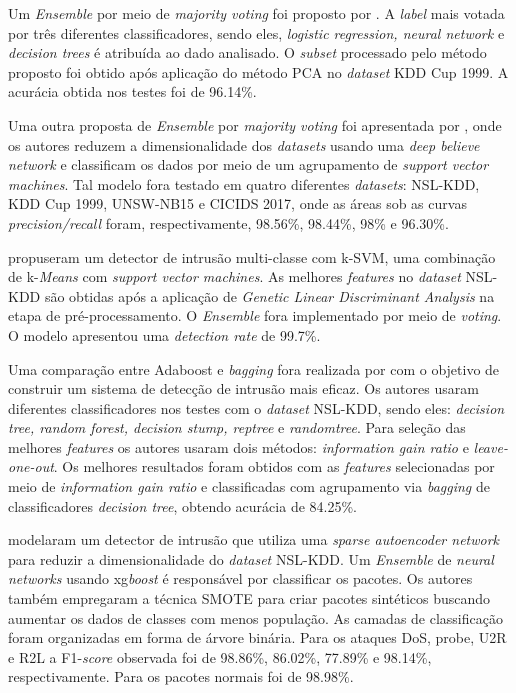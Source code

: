 Um \textit{Ensemble} por meio de \textit{majority voting} foi proposto por . A \textit{label} mais votada por três diferentes classificadores, sendo eles, \textit{logistic regression, neural network} e \textit{decision trees} é atribuída ao dado analisado. O \textit{subset} processado pelo método proposto foi obtido após aplicação do método PCA no \textit{dataset} KDD Cup 1999. A acurácia obtida nos testes foi de 96.14\%.

Uma outra proposta de \textit{Ensemble} por \textit{majority voting} foi apresentada por , onde os autores reduzem a dimensionalidade dos \textit{datasets} usando uma \textit{deep believe network} e classificam os dados por meio de um agrupamento de \textit{support vector machines}. Tal modelo fora testado em quatro diferentes \textit{datasets}: NSL-KDD, KDD Cup 1999, UNSW-NB15 e CICIDS 2017, onde as áreas sob as curvas \textit{precision/recall} foram, respectivamente, 98.56\%, 98.44\%, 98\% e 96.30\%.

 propuseram um detector de intrusão multi-classe com k-SVM, uma combinação de k-\textit{Means} com \textit{support vector machines}. As melhores \textit{features} no \textit{dataset} NSL-KDD são obtidas após a aplicação de \textit{Genetic Linear Discriminant Analysis} na etapa de pré-processamento. O \textit{Ensemble} fora implementado por meio de \textit{voting}. O modelo apresentou uma \textit{detection rate} de 99.7\%.

Uma comparação entre Adaboost e \textit{bagging} fora realizada por  com o objetivo de construir um sistema de detecção de intrusão mais eficaz. Os autores usaram diferentes classificadores nos testes com o \textit{dataset} NSL-KDD, sendo eles: \textit{decision tree, random forest, decision stump, reptree} e \textit{randomtree}. Para seleção das melhores \textit{features} os autores usaram dois métodos: \textit{information gain ratio} e \textit{leave-one-out}. Os melhores resultados foram obtidos com as \textit{features} selecionadas por meio de \textit{information gain ratio} e classificadas com agrupamento via \textit{bagging} de classificadores \textit{decision tree}, obtendo acurácia de 84.25\%.

 modelaram um detector de intrusão que utiliza uma \textit{sparse autoencoder network} para reduzir a dimensionalidade do \textit{dataset} NSL-KDD. Um \textit{Ensemble} de \textit{neural networks} usando xg\textit{boost} é responsável por classificar os pacotes. Os autores também empregaram a técnica SMOTE para criar pacotes sintéticos buscando aumentar os dados de classes com menos população. As camadas de classificação foram organizadas em forma de árvore binária. Para os ataques DoS, probe, U2R e R2L a F1-\textit{score} observada foi de 98.86\%, 86.02\%, 77.89\% e 98.14\%, respectivamente. Para os pacotes normais foi de 98.98\%.

